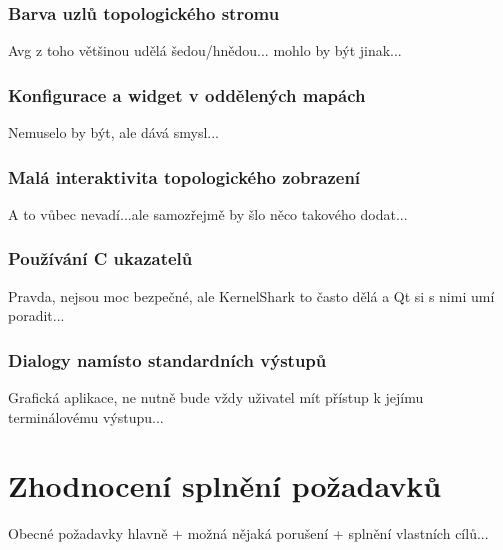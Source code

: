 \subsubsection*{Barva uzlů topologického stromu}
Avg z toho většinou udělá šedou/hnědou... mohlo by být jinak...

\subsubsection*{Konfigurace a widget v oddělených mapách}
Nemuselo by být, ale dává smysl...

\subsubsection*{Malá interaktivita topologického zobrazení}
A to vůbec nevadí...ale samozřejmě by šlo něco takového dodat...

\subsubsection*{Používání C ukazatelů}
Pravda, nejsou moc bezpečné, ale KernelShark to často dělá a Qt si s nimi umí poradit...

\subsubsection*{Dialogy namísto standardních výstupů}
Grafická aplikace, ne nutně bude vždy uživatel mít přístup k jejímu terminálovému výstupu...

\section{Zhodnocení splnění požadavků}
Obecné požadavky hlavně + možná nějaká porušení + splnění vlastních cílů...
